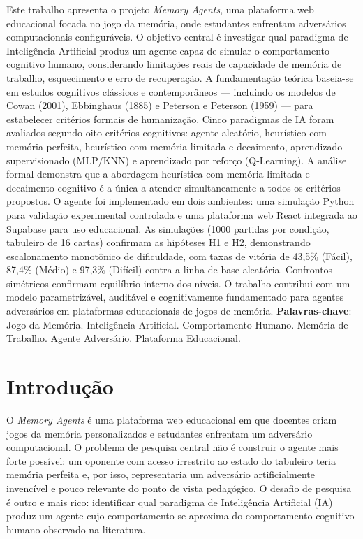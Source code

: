 \documentclass[
    12pt,
    openright,
    twoside,
    a4paper,
    english,
    brazil
]{abntex2}
\begin{document}
\frenchspacing
\imprimircapa
\imprimirfolhaderosto*

\begin{resumo}
Este trabalho apresenta o projeto \textit{Memory Agents}, uma plataforma web educacional focada no jogo da memória, onde estudantes enfrentam adversários computacionais configuráveis. O objetivo central é investigar qual paradigma de Inteligência Artificial produz um agente capaz de simular o comportamento cognitivo humano, considerando limitações reais de capacidade de memória de trabalho, esquecimento e erro de recuperação. A fundamentação teórica baseia-se em estudos cognitivos clássicos e contemporâneos — incluindo os modelos de Cowan (2001), Ebbinghaus (1885) e Peterson e Peterson (1959) — para estabelecer critérios formais de humanização. Cinco paradigmas de IA foram avaliados segundo oito critérios cognitivos: agente aleatório, heurístico com memória perfeita, heurístico com memória limitada e decaimento, aprendizado supervisionado (MLP/KNN) e aprendizado por reforço (Q-Learning). A análise formal demonstra que a abordagem heurística com memória limitada e decaimento cognitivo é a única a atender simultaneamente a todos os critérios propostos. O agente foi implementado em dois ambientes: uma simulação Python para validação experimental controlada e uma plataforma web React integrada ao Supabase para uso educacional. As simulações (1000 partidas por condição, tabuleiro de 16 cartas) confirmam as hipóteses H1 e H2, demonstrando escalonamento monotônico de dificuldade, com taxas de vitória de 43,5\% (Fácil), 87,4\% (Médio) e 97,3\% (Difícil) contra a linha de base aleatória. Confrontos simétricos confirmam equilíbrio interno dos níveis. O trabalho contribui com um modelo parametrizável, auditável e cognitivamente fundamentado para agentes adversários em plataformas educacionais de jogos de memória.
\vspace{\onelineskip}
\noindent
\textbf{Palavras-chave}: Jogo da Memória. Inteligência Artificial. Comportamento Humano. Memória de Trabalho. Agente Adversário. Plataforma Educacional.
\end{resumo}

\textual

\chapter{Introdução}

O \textit{Memory Agents} é uma plataforma web educacional em que docentes criam jogos da memória personalizados e estudantes enfrentam um adversário computacional. O problema de pesquisa central não é construir o agente mais forte possível: um oponente com acesso irrestrito ao estado do tabuleiro teria memória perfeita e, por isso, representaria um adversário artificialmente invencível e pouco relevante do ponto de vista pedagógico. O desafio de pesquisa é outro e mais rico: identificar qual paradigma de Inteligência Artificial (IA) produz um agente cujo comportamento se aproxima do comportamento cognitivo humano observado na literatura.
\end{document}
